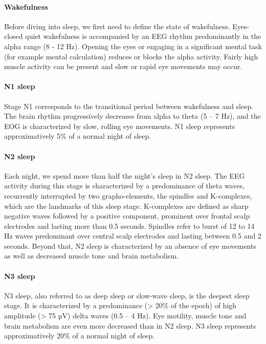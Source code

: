 \paragraph{Wakefulness}
Before diving into sleep, we first need to define the state of wakefulness. Eyes-closed quiet wakefulness is accompanied by an EEG rhythm predominantly in the alpha range (8 - 12 Hz). Opening the eyes or engaging in a significant mental task (for example mental calculation) reduces or blocks the alpha activity. Fairly high muscle activity can be present and slow or rapid eye movements may occur.

\paragraph{N1 sleep}
Stage N1 corresponds to the transitional period between wakefulness and sleep. The brain rhythm progressively decreases from alpha to theta (5 – 7 Hz), and the EOG is characterized by slow, rolling eye movements. N1 sleep represents approximatively 5\% of a normal night of sleep.

\paragraph{N2 sleep}
Each night, we spend more than half the night’s sleep in N2 sleep. The EEG activity during this stage is characterized by a predominance of theta waves, recurrently interrupted by two grapho-elements, the spindles and K-complexes, which are the landmarks of this sleep stage. K-complexes are defined as sharp negative waves followed by a positive component, prominent over frontal scalp electrodes and lasting more than 0.5 seconds. Spindles refer to burst of 12 to 14 Hz waves predominant over central scalp electrodes and lasting between 0.5 and 2 seconds. Beyond that, N2 sleep is characterized by an absence of eye movements as well as decreased muscle tone and brain metabolism.

\paragraph{N3 sleep}
N3 sleep, also referred to as deep sleep or slow-wave sleep, is the deepest sleep stage. It is characterized by a predominance (> 20\% of the epoch) of high amplitude (> 75 µV) delta waves (0.5 – 4 Hz). Eye motility, muscle tone and brain metabolism are even more decreased than in N2 sleep. N3 sleep represents approximatively 20\% of a normal night of sleep.

